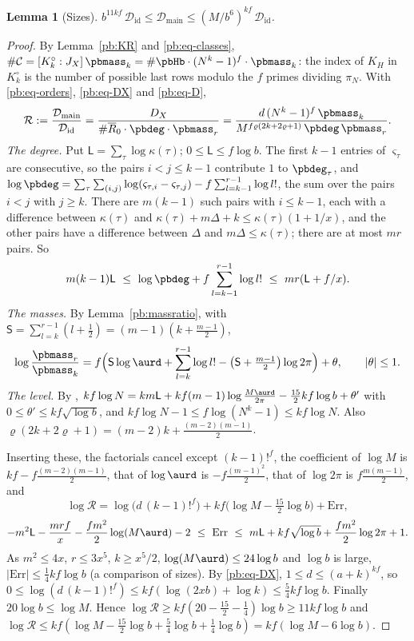 \documentclass[10pt]{amsart}
\newtheorem{lemma}[theorem]{Lemma}
\theoremstyle{definition}
\theoremstyle{remark}
\providecommand{\auDX}{D_X}
\providecommand{\pbDid}{\mathcal D_{\mathrm{id}}}
\providecommand{\pbDmain}{\mathcal D_{\mathrm{main}}}
\providecommand{\pbR}{\overline R_0}
\begin{document}
\begin{lemma}[Sizes]\label{pb:sizes}
$b^{11kf}\,\pbDid\le\pbDmain\le(M/b^6)^{kf}\,\pbDid$.
\end{lemma}
\begin{proof}
By Lemma~\ref{pb:KR} and \eqref{pb:eq-classes}, $\#\mathcal C=[K^\circ_k:J_X]\,\pbmass_k=\#\pbHb
\cdot(N^k-1)^f\cdot\pbmass_k$: the index of $K_H$ in $K^\circ_k$ is the number of possible last
rows modulo the $f$ primes dividing $\pi_N$. With \eqref{pb:eq-orders}, \eqref{pb:eq-DX} and
\eqref{pb:eq-D},
\[
\mathcal R:=\frac{\pbDmain}{\pbDid}=\frac{\auDX}{\#\pbR\cdot\pbdeg\cdot\pbmass_r}=\frac{d\,(N^k-1)^f
\,\pbmass_k}{M^{f\varrho(2k+2\varrho+1)}\,\pbdeg\,\pbmass_r} .
\]
\emph{The degree.} Put $\mathsf L=\sum_\tau\log\kappa(\tau)$; $0\le\mathsf L\le f\log b$. The first
$k-1$ entries of $\varsigma_\tau$ are consecutive, so the pairs $i<j\le k-1$ contribute $1$ to
$\pbdeg_\tau$, and $\log\pbdeg=\sum_\tau\sum_{(i,j)}\log(\varsigma_{\tau,i}-\varsigma_{\tau,j})-f
\sum_{l=k-1}^{r-1}\log l!$, the sum over the pairs $i<j$ with $j\ge k$. There are $m(k-1)$ such
pairs with $i\le k-1$, each with a difference between $\kappa(\tau)$ and $\kappa(\tau)+m\Delta+k\le
\kappa(\tau)(1+1/x)$, and the other pairs have a difference between $\Delta$ and $m\Delta\le\kappa(
\tau)$; there are at most $mr$ pairs. So
\[
m(k-1)\mathsf L\ \le\ \log\pbdeg+f\sum_{l=k-1}^{r-1}\log l!\ \le\ mr(\mathsf L+f/x).
\]
\emph{The masses.} By Lemma~\ref{pb:massratio}, with $\mathsf S=\sum_{l=k}^{r-1}(l+\frac12)=(m-1)(k+
\frac{m-1}2)$,
\[
\log\frac{\pbmass_r}{\pbmass_k}=f\Bigl(\mathsf S\log\aurd+\sum_{l=k}^{r-1}\log l!-\bigl(\mathsf S+
\tfrac{m-1}2\bigr)\log2\pi\Bigr)+\theta,\qquad|\theta|\le1 .
\]
\emph{The level.} By {\cite[(37)]{P46}}, $kf\log N=km\mathsf L+kf(m-1)\log\frac{M\aurd}{2\pi}-
\frac{15}2kf\log b+\theta'$ with $0\le\theta'\le kf\sqrt{\log b}$, and $kf\log N-1\le f\log(N^k-1)
\le kf\log N$. Also $\varrho(2k+2\varrho+1)=(m-2)k+\frac{(m-2)(m-1)}2$.

Inserting these, the factorials cancel except $(k-1)!^f$, the coefficient of $\log M$ is $kf-f
\frac{(m-2)(m-1)}2$, that of $\log\aurd$ is $-f\frac{(m-1)^2}2$, that of $\log2\pi$ is $f\frac{m(m-
1)}2$, and
\[
\log\mathcal R=\log\bigl(d\,(k-1)!^f\bigr)+kf\bigl(\log M-\tfrac{15}2\log b\bigr)+\mathrm{Err},
\]
\[
-m^2\mathsf L-\frac{mrf}x-\frac{fm^2}2\log(M\aurd)-2\ \le\ \mathrm{Err}\ \le\ m\mathsf L+kf\sqrt{
\log b}+\frac{fm^2}2\log2\pi+1 .
\]
As $m^2\le4x$, $r\le3x^5$, $k\ge x^5/2$, $\log(M\aurd)\le24\log b$ and $\log b$ is large,
$|\mathrm{Err}|\le\frac14kf\log b$ (a comparison of sizes). By \eqref{pb:eq-DX}, $1\le d\le(a+k)^{
kf}$, so $0\le\log(d\,(k-1)!^f)\le kf(\log(2xb)+\log k)\le\frac54kf\log b$. Finally $20\log b\le
\log M$. Hence $\log\mathcal R\ge kf(20-\frac{15}2-\frac14)\log b\ge11kf\log b$ and $\log\mathcal
R\le kf(\log M-\frac{15}2\log b+\frac54\log b+\frac14\log b)=kf(\log M-6\log b)$.
\end{proof}
\end{document}
